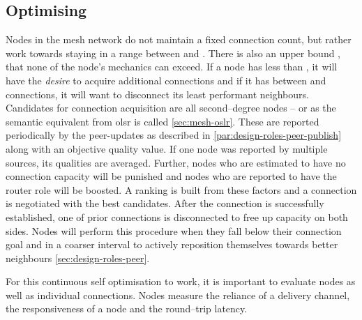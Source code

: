 \subsection{Optimising}\label{sec:design-optimising}

Nodes in the mesh network do not maintain a fixed connection count, but rather work towards staying in a range between \minConnectionGoal and \maxConnectionGoal. There is also an upper bound \maxConnections, that none of the node's mechanics can exceed. If a node has less than \minConnectionGoal, it will have the \textit{desire} to acquire additional connections and if it has between \maxConnectionGoal and \maxConnections connections, it will want to disconnect its least performant neighbours. Candidates for connection acquisition are all second–degree nodes – or  as the semantic equivalent from \gls{olsr} is called \cref{sec:mesh-oslr}. These are reported periodically by the \glspl{peer-update} as described in \ref{par:design-roles-peer-publish} along with an objective quality value. If one node was reported by multiple sources, its qualities are averaged. Further, nodes who are estimated to have no connection capacity will be punished and nodes who are reported to have the router role will be boosted. A ranking is built from these factors and a connection is negotiated with the best candidates. After the connection is successfully established, one of prior connections is disconnected to free up capacity on both sides.
Nodes will perform this procedure when they fall below their connection goal \minConnectionGoal and in a coarser interval to actively reposition themselves towards better neighbours \cref{sec:design-roles-peer}.

For this continuous self optimisation to work, it is important to evaluate nodes as well as individual connections. Nodes measure the reliance of a delivery channel, the responsiveness of a node and the round–trip latency.
